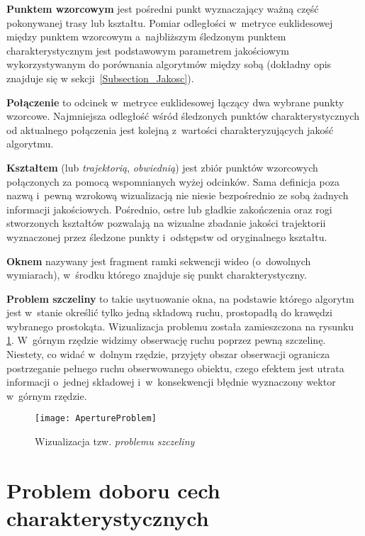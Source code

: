    \textbf{Punktem wzorcowym} jest pośredni punkt wyznaczający ważną część pokonywanej trasy lub kształtu. Pomiar odległości w~metryce euklidesowej między punktem wzorcowym a~najbliższym śledzonym punktem charakterystycznym jest podstawowym parametrem jakościowym wykorzystywanym do porównania algorytmów między sobą (dokładny opis znajduje się w sekcji~\ref{Subsection_Jakosc}).

    \textbf{Połączenie} to odcinek w~metryce euklidesowej łączący dwa wybrane punkty wzorcowe. Najmniejsza odległość wśród śledzonych punktów charakterystycznych od aktualnego połączenia jest kolejną z~wartości charakteryzujących jakość algorytmu.

    \textbf{Kształtem} (lub \textit{trajektorią}, \textit{obwiednią}) jest zbiór punktów wzorcowych połączonych za pomocą wspomnianych wyżej odcinków. Sama definicja poza nazwą i~pewną wzrokową wizualizacją nie niesie bezpośrednio ze sobą żadnych informacji jakościowych. Pośrednio, ostre lub gładkie zakończenia oraz rogi stworzonych kształtów pozwalają na wizualne zbadanie jakości trajektorii wyznaczonej przez śledzone punkty i~odstępstw od oryginalnego kształtu.

    \textbf{Oknem} nazywany jest fragment ramki sekwencji wideo (o~dowolnych wymiarach), w~środku którego znajduje się punkt charakterystyczny.

    \textbf{Problem szczeliny} to takie usytuowanie okna, na podstawie którego algorytm jest w~stanie określić tylko jedną składową ruchu, prostopadłą do krawędzi wybranego prostokąta. Wizualizacja problemu została zamieszczona na rysunku \ref{fig:ApertureProblem}. W~górnym rzędzie widzimy obserwację ruchu poprzez pewną szczelinę. Niestety, co widać w~dolnym rzędzie, przyjęty obszar obserwacji ogranicza postrzeganie pełnego ruchu obserwowanego obiektu, czego efektem jest utrata informacji o~jednej składowej i~w~konsekwencji błędnie wyznaczony wektor w~górnym rzędzie.

      \begin{figure}[!ht]
        \centering
        \texttt{[image: ApertureProblem]}
        \caption[Wizualizacja tzw. problemu szczeliny]{Wizualizacja tzw. \textit{problemu szczeliny}}
        \label{fig:ApertureProblem}
      \end{figure}

  \newpage
  \section{Problem doboru cech charakterystycznych}\label{Section_GoodFeaturesToTrack}

